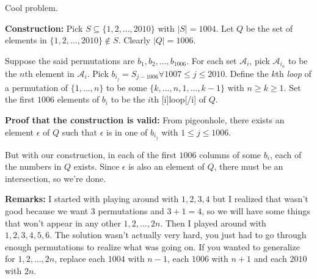 Cool problem.

\textbf{Construction:} Pick $S\subseteq \{1,2,...,2010\}$ with $|S|=1004$. Let $Q$ be the set of elements in $\{1,2,...,2010\}\notin S$. Clearly $|Q|=1006$.

Suppose the said permutations are $b_1, b_2,..., b_{1006}$. For each set $\mathcal{A}_i$, pick $\mathcal{A}_{i_n}$ to be the $n$th element in $\mathcal{A}_i$.
Pick $b_{i_j}=S_{j-1006}\forall 1007\le j\le 2010$. Define the $k$th \textit{loop} of a permutation of $\{1,...,n\}$ to be some $\{k,...,n,1,...,k-1\}$
with $n\ge k\ge 1$. Set the first $1006$ elements of $b_i$ to be the $i$th [i]loop[/i] of $Q$.

\textbf{Proof that the construction is valid:} From pigeonhole, there exists an element $\epsilon$ of $Q$ such that $\epsilon$ is in one of 
$b_{i_j}$ with $1\le j\le 1006$.

But with our construction, in each of the first $1006$ columns of some $b_i$, each of the numbers in $Q$ exists. Since $\epsilon$ is also an element of $Q$,
    there must be an intersection, so we're done.

\textbf{Remarks:}
I started with playing around with $1,2,3,4$ but I realized that wasn't good because we want $3$ permutations and $3+1=4$, so we 
will have some things that won't appear in any other $1,2,...,2n$. Then I played around with $1,2,3,4,5,6$. The solution wasn't actually very hard, 
you just had to go through enough permutations to realize what was going on. If you wanted to generalize for $1,2,...,2n$, 
replace each $1004$ with $n-1$, each $1006$ with $n+1$ and each $2010$ with $2n$.

